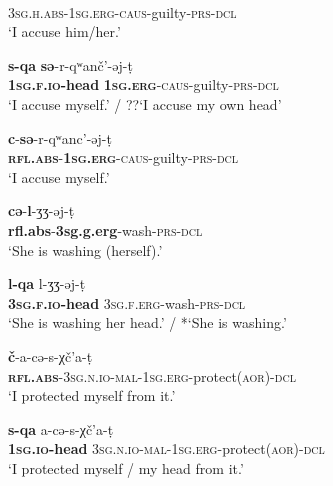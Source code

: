 \documentclass[output=paper]{langscibook}
\begin{document}
 
\ea 
\label{ex:Arkadiev:29}
    \ea 
    \label{ex:Arkadiev:29a}
    \\
       \textsc{3sg.h.abs-1sg.erg-caus-}guilty-\textsc{prs-dcl}\\
    \glt ‘I accuse him/her.’
    
    \ex 
    \label{ex:Arkadiev:29b}
    \gll \textbf{{s-qa}}  \textbf{{s{ə}}}{{}-r-q{ʷ}anč’-{ə}j-{ṭ}}\\
      \textbf{\textsc{1sg.f.io}}\textbf{{}-head}  \textbf{\textsc{1sg.erg}}\textsc{{}-caus}{}-guilty-\textsc{prs-dcl}\\
    \glt ‘I accuse myself.’ / ??‘I accuse my own head’
    
    \ex 
    \label{ex:Arkadiev:29c}
    \gll \textbf{{c}}{{}-}\textbf{{s{ə}}}{{}-r-q{ʷ}anc’-{ə}j-t{̣}}\\
     \textbf{    }\textbf{\textsc{rfl.abs}}\textsc{{}-}\textbf{\textsc{1sg.erg}}\textsc{{}-caus-}guilty-\textsc{prs-dcl}\\
    \glt ‘I accuse myself.’
\z
\z

\ea 
\label{ex:Arkadiev:30}
    \ea 
    \label{ex:Arkadiev:30a}
    \gll \textbf{{c{ə}}}{{}-}\textbf{{l}}{{}-{ʒ}{ʒ}{}-{ə}j-t{̣}}\\
       \textbf{rfl.abs}{}-\textbf{3sg.g.erg}{}-wash-\textsc{prs-dcl}\\
    \glt ‘She is washing (herself).’
    
    \ex 
    \label{ex:Arkadiev:30b}
    \gll \textbf{{l-qa}  }{l-{ʒ}{ʒ}{}-{ə}j-t{̣}}\\
     \textbf{\textsc{3sg.f.io}}\textbf{{}-head}  \textsc{3sg.f.erg}{}-wash-\textsc{prs-dcl}\\
    \glt ‘She is washing her head.’ / *‘She is washing.’
\z
\z

\ea 
\label{ex:Arkadiev:31}
    \ea 
    \label{ex:Arkadiev:31a}
    \gll \textbf{{č}}{{}-a-c{ə}-s-χč’a-t{̣}}\\
      \textbf{\textsc{rfl.abs}}\textsc{{}-3sg.n.io-mal-1sg.erg}{}-protect(\textsc{aor})-\textsc{dcl} \\
    \glt ‘I protected myself from it.’
    
    \ex 
    \label{ex:Arkadiev:31b}
    \gll \textbf{{s-qa}}  {a-c{ə}-s-χč’a-t{̣}}\\
    \textbf{\textsc{1sg.io-}}\textbf{head}  \textsc{3sg.n.io-mal-1sg.erg}{}-protect(\textsc{aor})-\textsc{dcl} \\
    \glt ‘I protected myself / my head from it.’
\z
\z
\end{document}
